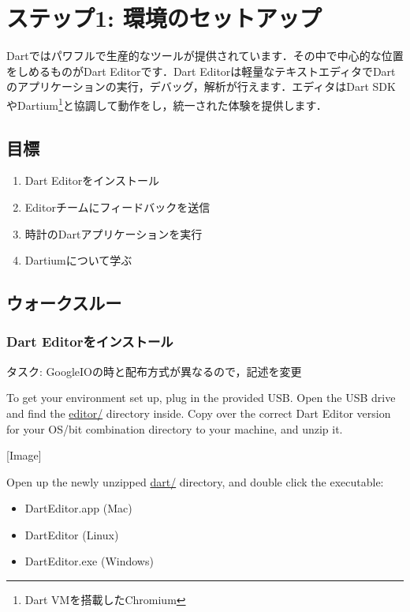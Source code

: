 \chapter*{ステップ1: 環境のセットアップ}
\addtocounter{chapter}{1}

Dartではパワフルで生産的なツールが提供されています．その中で中心的な位置をしめるものがDart Editorです．Dart Editorは軽量なテキストエディタでDartのアプリケーションの実行，デバッグ，解析が行えます．エディタはDart SDKやDartium\footnote{Dart VMを搭載したChromium}と協調して動作をし，統一された体験を提供します．

\section{目標}

\begin{enumerate}
\item Dart Editorをインストール
\item Editorチームにフィードバックを送信
\item 時計のDartアプリケーションを実行
\item Dartiumについて学ぶ
\end{enumerate}

\section{ウォークスルー}

\subsection{Dart Editorをインストール}

タスク: GoogleIOの時と配布方式が異なるので，記述を変更

To get your environment set up, plug in the provided USB. Open the USB drive and find the \url{editor/} directory inside. Copy over the correct Dart Editor version for your OS/bit combination directory to your machine, and unzip it.

[Image]

Open up the newly unzipped \url{dart/} directory, and double click the executable:

\begin{itemize}
\item DartEditor.app (Mac)
\item DartEditor (Linux)
\item DartEditor.exe (Windows)
\end{itemize}

